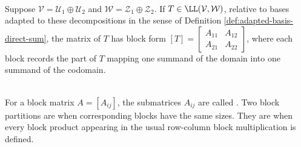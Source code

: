\begin{definition} \\
Suppose $\mathcal{V} = \mathcal{U}_1 \oplus \mathcal{U}_2$ and $\mathcal{W} = \mathcal{Z}_1 \oplus \mathcal{Z}_2$. If $T \in \LL(\mathcal{V}, \mathcal{W})$, relative to bases adapted to these decompositions in the sense of Definition \ref{def:adapted-basis-direct-sum}, the matrix of $T$ has block form $[T] =
\begin{bmatrix}
A_{11} & A_{12} \\
A_{21} & A_{22}
\end{bmatrix}$,
where each block records the part of $T$ mapping one summand of the domain into one summand of the codomain.
\end{definition}

\begin{definition} \\
For a block matrix $A=[A_{ij}]$, the submatrices $A_{ij}$ are called . Two block partitions are  when corresponding blocks have the same sizes. They are  when every block product appearing in the usual row-column block multiplication is defined.
\end{definition}

